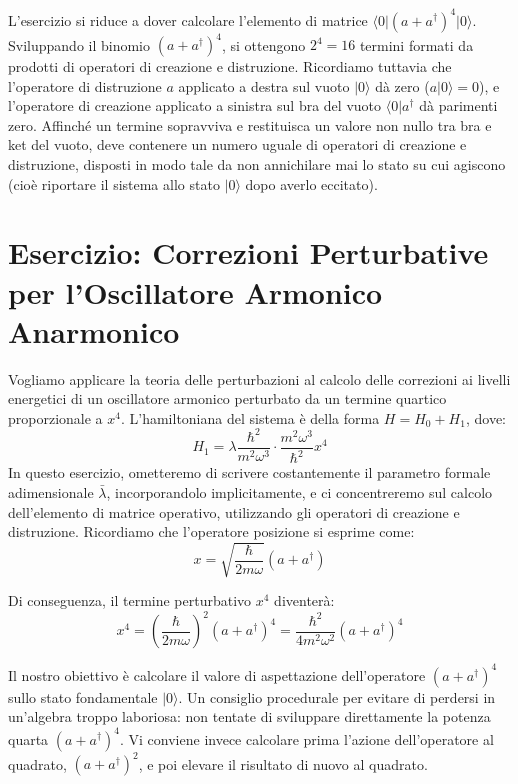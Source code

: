 L'esercizio si riduce a dover calcolare l'elemento di matrice $\langle 0 \vert{} (a + a^\dagger)^4 \vert{} 0 \rangle$.
Sviluppando il binomio $(a + a^\dagger)^4$, si ottengono $2^4 = 16$ termini formati da prodotti di operatori di creazione e distruzione. Ricordiamo tuttavia che l'operatore di distruzione $a$ applicato a destra sul vuoto $\vert{}0\rangle$ dà zero ($a\vert{}0\rangle = 0$), e l'operatore di creazione applicato a sinistra sul bra del vuoto $\langle 0 \vert{} a^\dagger$ dà parimenti zero. Affinché un termine sopravviva e restituisca un valore non nullo tra bra e ket del vuoto, deve contenere un numero uguale di operatori di creazione e distruzione, disposti in modo tale da non annichilare mai lo stato su cui agiscono (cioè riportare il sistema allo stato $\vert{}0\rangle$ dopo averlo eccitato).

\section{Esercizio: Correzioni Perturbative per l'Oscillatore Armonico Anarmonico}

Vogliamo applicare la teoria delle perturbazioni al calcolo delle correzioni ai livelli energetici di un oscillatore armonico perturbato da un termine quartico proporzionale a $x^4$. L'hamiltoniana del sistema è della forma $H = H_0 + H_1$, dove:
\begin{equation}
H_1 = \lambda \frac{\hbar^2}{m^2 \omega^3} \cdot \frac{m^2 \omega^3}{\hbar^2} x^4
\end{equation}
In questo esercizio, ometteremo di scrivere costantemente il parametro formale adimensionale $\bar{\lambda}$, incorporandolo implicitamente, e ci concentreremo sul calcolo dell'elemento di matrice operativo, utilizzando gli operatori di creazione e distruzione. Ricordiamo che l'operatore posizione si esprime come:
\begin{equation}
x = \sqrt{\frac{\hbar}{2m\omega}}(a + a^\dagger)
\end{equation}

Di conseguenza, il termine perturbativo $x^4$ diventerà:
\begin{equation}
x^4 = \left(\frac{\hbar}{2m\omega}\right)^2 (a + a^\dagger)^4 = \frac{\hbar^2}{4m^2\omega^2} (a + a^\dagger)^4
\end{equation}

Il nostro obiettivo è calcolare il valore di aspettazione dell'operatore $(a + a^\dagger)^4$ sullo stato fondamentale $\vert{}0\rangle$.
Un consiglio procedurale per evitare di perdersi in un'algebra troppo laboriosa: non tentate di sviluppare direttamente la potenza quarta $(a + a^\dagger)^4$. Vi conviene invece calcolare prima l'azione dell'operatore al quadrato, $(a + a^\dagger)^2$, e poi elevare il risultato di nuovo al quadrato.

